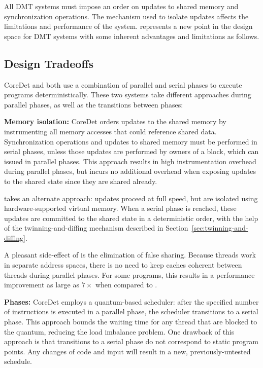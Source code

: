 \label{sec:discussion} All DMT systems must impose an order on updates to shared memory and synchronization operations.  The
mechanism used to isolate updates affects the limitations and performance of the
system.  \dthreads{} represents a new point in the design space for DMT systems with some inherent advantages and limitations as follows.

\subsection{Design Tradeoffs} 

CoreDet and \dthreads{} both use a combination of
parallel and serial phases to execute programs deterministically.  These two systems take different approaches during parallel phases, as
well as the transitions between phases:

\textbf{Memory isolation:} 
CoreDet orders updates to the shared memory by
instrumenting all memory accesses that could reference shared data. Synchronization operations and updates to shared memory must be performed in serial phases, unless those updates are performed by owners of a block, which can issued in parallel phases. This approach results in high instrumentation overhead during parallel phases, but incurs no additional overhead when exposing updates to the shared state since they are shared already.

\dthreads{} takes an alternate approach: updates proceed at full speed, but are isolated using hardware-supported virtual memory.  When a serial phase is reached, these updates are committed to the shared state in a deterministic order, with
the help of the twinning-and-diffing mechanism described in Section~\ref{sec:twinning-and-diffing}.

A pleasant side-effect of \dthreads{} is the elimination of false sharing. Because threads work in separate address spaces, there is no need to keep caches coherent between threads during parallel phases.  For some programs, this results in a performance improvement as large as $7\times$ when compared to
\pthreads{}.

\textbf{Phases:} 
CoreDet employs a quantum-based scheduler: after the specified number of instructions is executed in a parallel phase, the scheduler transitions to a serial phase. This approach bounds the waiting time for any thread that are blocked to the quantum, reducing the load imbalance problem.  One drawback of this approach is that transitions to a serial phase do not correspond to static program points.  Any changes of code and input will result in a new, previously-untested schedule.

